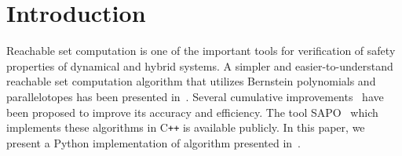 \documentclass[EPiC]{easychair}
\begin{document}
%
%
%
\section{Introduction}

Reachable set computation is one of the 
important tools %
for verification of safety properties of dynamical and hybrid systems.
%
A simpler and easier-to-understand reachable set computation algorithm that utilizes Bernstein polynomials and parallelotopes has been presented in~\cite{dang2009image}.
%
Several cumulative improvements~\cite{dang2012reachability,sassi2012reachability,dang2014parameter,dreossi2016parallelotope,dreossi2017reachability} have been proposed to improve its accuracy and efficiency.
%
The tool SAPO~\cite{dreossi2017sapo} which implements these algorithms in C\texttt{++} is available publicly.
%
In this paper, we present a Python implementation of algorithm presented in~\cite{dreossi2017reachability}.
\end{document}
